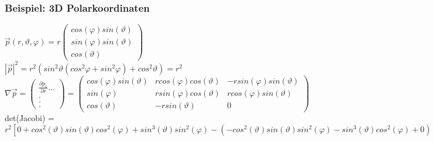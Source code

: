 \documentclass{article}
\begin{document}
\subsubsection{Beispiel: 3D Polarkoordinaten}
$\vec p(r, \vartheta, \varphi) = r
\begin{pmatrix}
cos(\varphi) sin(\vartheta) \\
sin(\varphi) sin(\vartheta) \\
cos(\vartheta)
\end{pmatrix}$\\
$|\vec p|^2 = r^2(sin^2\vartheta(cos^2\varphi + sin^2\varphi)+cos^2\vartheta) = r^2$\\
$\nabla \vec p =
\begin{pmatrix}
\frac{\partial p_1}{\partial r} ... \\
.\\
.\\
.
\end{pmatrix}
=
\begin{pmatrix}
cos(\varphi) sin(\vartheta) & r cos(\varphi) cos(\vartheta) & -r sin(\varphi) sin(\vartheta)  \\
sin(\varphi) & r sin(\varphi) cos(\vartheta) & r cos(\varphi) sin(\vartheta) \\
cos(\vartheta) & -r sin(\vartheta) & 0
\end{pmatrix}
 $ \\
 det(Jacobi) = $r^2 [0+cos^2(\vartheta)sin(\vartheta)cos^2(\varphi)+sin^3(\vartheta) sin^2(\varphi)-(-cos^2(\vartheta) sin(\vartheta) sin^2(\varphi)-sin^3(\vartheta) cos^2(\varphi)+0)] = r^2 (sin^3(\vartheta) + sin(\vartheta) cos^2(\vartheta))= r^2 sin(\vartheta)$
\end{document}
